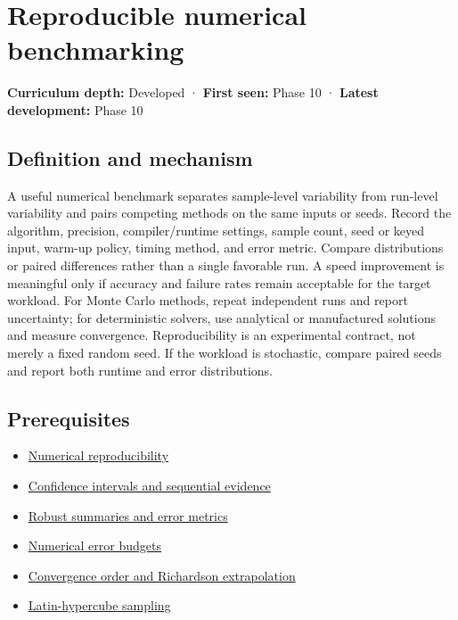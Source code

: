 \hypertarget{appendix-b9db93e28371}{}\label{referencestart:appendix-b9db93e28371}
\section{Reproducible numerical benchmarking}\label{appendix-b9db93e28371-reproducible-numerical-benchmarking}

\textbf{Curriculum depth:} Developed · \textbf{First seen:} Phase 10 · \textbf{Latest development:} Phase 10

\subsection{Definition and mechanism}\label{appendix-b9db93e28371-definition-and-mechanism}

A useful numerical benchmark separates sample-level variability from run-level variability and pairs competing methods on the same inputs or seeds. Record the algorithm, precision, compiler/runtime settings, sample count, seed or keyed input, warm-up policy, timing method, and error metric. Compare distributions or paired differences rather than a single favorable run. A speed improvement is meaningful only if accuracy and failure rates remain acceptable for the target workload. For Monte Carlo methods, repeat independent runs and report uncertainty; for deterministic solvers, use analytical or manufactured solutions and measure convergence. Reproducibility is an experimental contract, not merely a fixed random seed. If the workload is stochastic, compare paired seeds and report both runtime and error distributions.

\subsection{Prerequisites}\label{appendix-b9db93e28371-prerequisites}

\begin{itemize}
\tightlist
\item
  \hyperref[appendix-5f1a2c3f97ff]{Numerical reproducibility}
\item
  \hyperref[appendix-c83016554b1e]{Confidence intervals and sequential evidence}
\item
  \hyperref[appendix-bcc44e9d3d02]{Robust summaries and error metrics}
\item
  \hyperref[appendix-31b8c295e05f]{Numerical error budgets}
\item
  \hyperref[appendix-aca80b6bf17a]{Convergence order and Richardson extrapolation}
\item
  \hyperref[appendix-1c5e85693a06]{Latin-hypercube sampling}
\end{itemize}

